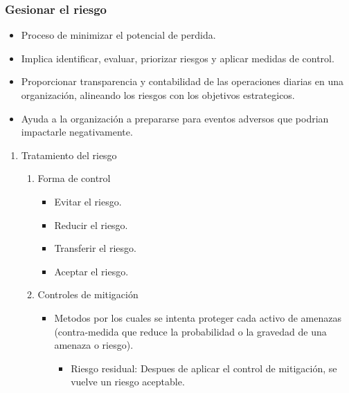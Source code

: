 \documentclass[11pt]{article}
\begin{document}
\subsubsection{Gesionar el riesgo}
\label{sec:org799c0c2}
\begin{itemize}
\item Proceso de minimizar el potencial de perdida.
\item Implica identificar, evaluar, priorizar riesgos y aplicar medidas de control.
\item Proporcionar transparencia y contabilidad de las operaciones diarias en una organización, alineando los riesgos con los objetivos estrategicos.
\item Ayuda a la organización a prepararse para eventos adversos que podrian impactarle negativamente.
\end{itemize}
\begin{enumerate}
\item Tratamiento del riesgo
\label{sec:org8204893}
\begin{enumerate}
\item Forma de control
\label{sec:orgf2c2f9d}
\begin{itemize}
\item Evitar el riesgo.
\item Reducir el riesgo.
\item Transferir el riesgo.
\item Aceptar el riesgo.
\end{itemize}
\item Controles de mitigación
\label{sec:org97ff614}
\begin{itemize}
\item Metodos por los cuales se intenta proteger cada activo de amenazas (contra-medida que reduce la probabilidad o la gravedad de una amenaza o riesgo).
\begin{itemize}
\item Riesgo residual: Despues de aplicar el control de mitigación, se vuelve un riesgo aceptable.
\end{itemize}
\end{itemize}
\end{enumerate}
\end{enumerate}
\end{document}
